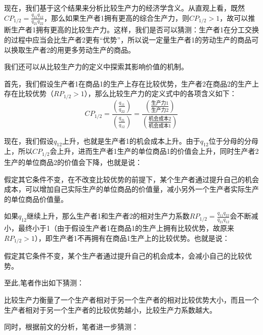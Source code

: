现在，我们基于这个结果来分析比较生产力的经济学含义。从直观上看，既然$\mathit{CP}_{1/2} = \frac{q_{11}q_{12}}{q_{21}q_{22}}$，那么如果生产者1拥有更高的综合生产力，则$ \mathit{CP}_{1/2} > 1 $，故可以推断生产者1拥有更高的比较生产力。这样，我们是否可以猜测：生产者1在分工交换的过程中应当会比生产者2更有“优势”，所以说一定量生产者1的劳动生产的商品可以换取生产者2的用更多劳动生产的商品。

我们还可以从比较生产力的定义中探索其影响价值的机制。

首先，我们假设生产者1在商品1的生产上存在比较优势，生产者2在商品2的生产上存在比较优势（$ \mathit{RP}_{1/2} > 1 $），那么比较生产力的定义式中的各项含义如下：
\begin{equation}
    \mathit{CP}_{1/2} = \frac{\left(\frac{q_{11}}{q_{22}}\right)}{\left(\frac{q_{21}}{q_{12}}\right)} = \frac{\left(\frac{\text{生产力1}}{\text{生产力2}}\right)}{\left(\frac{\text{机会成本2}}{\text{机会成本1}}\right)}
\end{equation}

现在，我们假设$ q_{12} $上升，也就是生产者1的机会成本上升。由于$ q_{12} $位于分母的分母上，所以$\mathit{CP}_{1/2} $会上升，进而生产者1生产的单位商品1的价值会上升，同时生产者2生产的单位商品2的价值会下降，也就是说：

\begin{proposition}
    假定其它条件不变，在不改变比较优势的前提下，某个生产者通过提升自己的机会成本，可以增加自己实际生产的单位商品的价值量，减小另外一个生产者实际生产的单位商品价值量。
\end{proposition}

如果$ q_{12} $继续上升，那么生产者1和生产者2的相对生产力系数$ \mathit{RP}_{1/2} = \frac{q_{11}q_{22}}{q_{21}q_{12}} $会不断减小，最终小于1（由于假设生产者1在商品1的生产上拥有比较优势，故原来$ \mathit{RP}_{1/2} > 1 $），即生产者1不再拥有在商品1生产上的比较优势。也就是说：

\begin{proposition}
    假定其它条件不变，某个生产者通过提升自己的机会成本，会减小自己的比较优势。
\end{proposition}

至此,笔者作出如下猜测：

\begin{conjecture}
    比较生产力衡量了一个生产者相对于另一个生产者的相对比较优势大小，而且一个生产者相对于另一个生产者的比较优势越小，比较生产力系数越大。
\end{conjecture}

同时，根据前文的分析，笔者进一步猜测：


